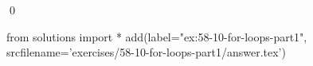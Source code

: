 
\begin{ex}
  \label{ex:58-10-for-loops-part1}
  
  \qed
\end{ex}
\begin{python0}
from solutions import *
add(label="ex:58-10-for-loops-part1",
    srcfilename='exercises/58-10-for-loops-part1/answer.tex')
\end{python0}
